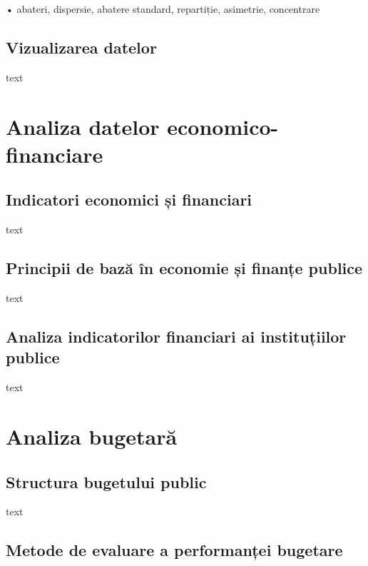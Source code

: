 \documentclass[
  11pt,
  b5paper,
  nottoc]{book}
\begin{document}
• abateri, dispersie, abatere standard, repartiție, asimetrie,
concentrare

\section{Vizualizarea datelor}\label{vizualizarea-datelor}

text


\chapter{Analiza datelor economico-financiare}\label{cap4}

\section{Indicatori economici și
financiari}\label{indicatori-economici-ux219i-financiari}

text

\section{Principii de bază în economie și finanțe
publice}\label{principii-de-bazux103-uxeen-economie-ux219i-finanux21be-publice}

text

\section{Analiza indicatorilor financiari ai instituțiilor
publice}\label{analiza-indicatorilor-financiari-ai-instituux21biilor-publice}

text


\chapter{Analiza bugetară}\label{cap5}

\section{Structura bugetului public}\label{structura-bugetului-public}

text

\section{Metode de evaluare a performanței
bugetare}\label{metode-de-evaluare-a-performanux21bei-bugetare}
\end{document}
